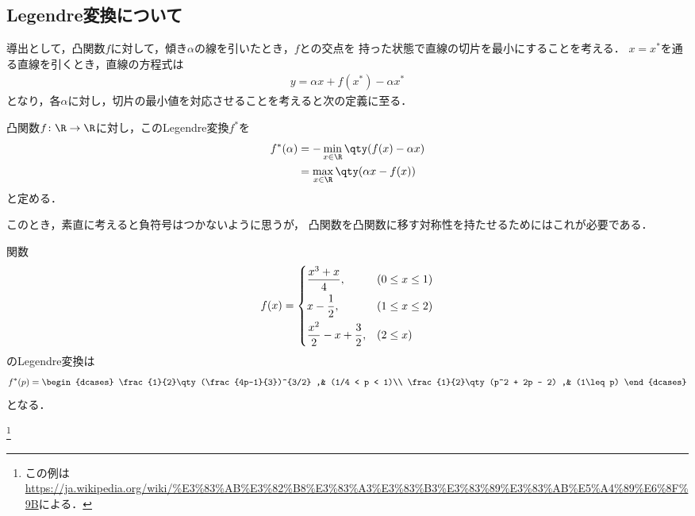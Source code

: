 \subsection{Legendre変換について}
導出として，凸関数$f$に対して，傾き$\alpha$の線を引いたとき，$f$との交点を
持った状態で直線の切片を最小にすることを考える．
$x =x^{*}$を通る直線を引くとき，直線の方程式は
\begin{align}
		y = \alpha x + f(x^{*}) - \alpha x^{*} 
\end{align}
となり，各$\alpha$に対し，切片の最小値を対応させることを考えると次の定義に至る．
\begin{defn}[Legendre変換]
		凸関数$f\colon\R\to\R$に対し，このLegendre変換$f^{*}$を
		\begin{align}
				f^{*}(\alpha) &= -\min_{x\in\R}\qty(f(x)-\alpha x)\\
				 &= \max_{x\in\R}\qty(\alpha x - f(x))\label{def_legendre}
		\end{align}
		と定める．
\end{defn}
このとき，素直に考えると負符号はつかないように思うが，
凸関数を凸関数に移す対称性を持たせるためにはこれが必要である．
\begin{eg}
		関数
		\begin{align}
				f(x)=
				\begin{dcases}
						\frac{x^3+x}{4} ,& (0\leq x \leq 1)\\
						x-\frac{1}{2} ,& (1 \leq x \leq 2)\\
						\frac{x^2}{2} - x + \frac{3}{2} ,& (2\leq x)
				\end{dcases}
		\end{align}
		のLegendre変換は
		\begin{align}
				f^{*}(p) = 
				\begin{dcases}
						\frac{1}{2}\qty(\frac{4p-1}{3})^{3/2} ,& (1/4 < p < 1)\\
						\frac{1}{2}\qty(p^2 + 2p - 2) ,& (1\leq p)
				\end{dcases}
		\end{align}
		となる．

		\footnote{この例は\url{https://ja.wikipedia.org/wiki/\%E3\%83\%AB\%E3\%82\%B8\%E3\%83\%A3\%E3\%83\%B3\%E3\%83\%89\%E3\%83\%AB\%E5\%A4\%89\%E6\%8F\%9B}による．}
\end{eg}
